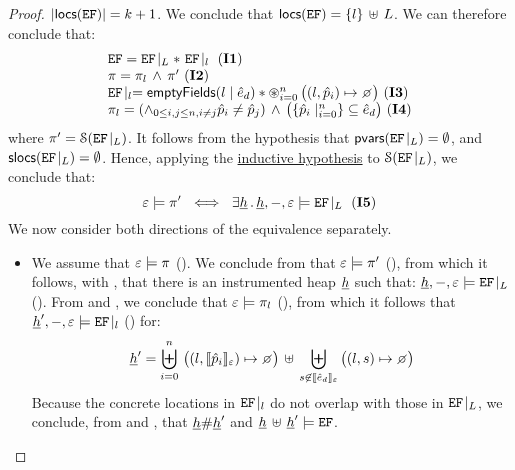 \begin{proof}
\noindent{}  $\vert {\sf locs}(\mathtt{EF}) \vert = k+1$. We conclude that 
${\sf locs}(\mathtt{EF}) = \{ l \} \, \uplus \, L$. We can therefore conclude that: 
$$
\begin{array}{l}
\efs = \efproj{\efs}{L} \sep \ \efproj{\efs}{\loc} \text{ (\ieq{1})}
%
\\
%
\pc = \pc_{\loc} \, \wedge \, \pc' \text{ (\ieq{2})}
%
\\ 
%
 \efproj{\efs}{\loc} = \emptyfields{\loc}{\sexpr_d} \sep  \oast_{i = 0}^{n} \, \big((l, \sexprp_i) \mapsto \none\big) \text{ (\ieq{3})}
%
\\ 
\pc_{\loc} = (\wedge_{0 \leq i, j \leq n, i \neq j} \sexprp_i \neq \sexprp_j)
		       \, \wedge \,  \big(\{  \sexprp_i \mid_{i = 0}^n \} \subseteq \sexpr_d \big) \text{ (\ieq{4})}
\end{array}
$$
where $\pi' = {\cal S}(\mathtt{EF}\!\mid_{L})$. It follows from the hypothesis 
that ${\sf pvars}(\mathtt{EF}\!\mid_{L}) = \emptyset$, and ${\sf slocs}(\mathtt{EF}\!\mid_{L}) = \emptyset$.
Hence, applying the \underline{inductive hypothesis} to ${\cal S}(\mathtt{EF}\!\mid_{L})$, 
we conclude that: 
$$
  \senv \satisfies \pc' \ \iff \ 
       \exists \iheap \, . \, \iheap, -, \senv \satisfies \efproj{\efs}{L} \text{ (\ieq{5})}
$$
We now consider both directions of the equivalence separately. 
\begin{itemize}
	\item {} We assume that $\varepsilon \models \pi$ (). We conclude from 
	 that $\varepsilon \models \pi'$ (\ieq{7}), from which it follows, with \ieq{5},  that there is an 
	 instrumented heap $\underline{h}$ such that: $\underline{h}, -, \varepsilon \models \mathtt{EF}\!\mid_{L}$ (\ieq{8}). 
	From \ieq{6} and \ieq{2}, we conclude that  $\varepsilon \models \pi_{l}$ (\ieq{9}), from which 
	it follows that $\underline{h}', -, \varepsilon \models \mathtt{EF}\!\mid_{l}$ (\ieq{10}) for: 
	$$
	  \iheap' =   \biguplus_{i = 0}^{n} \, \big((l, \symbeval{\sexprp_i}{\senv}) \mapsto  \none \big) 
	       \dunion \biguplus_{\jstring \not\in \symbeval{\sexpr_d}{\senv}} \big((l, \jstring) \mapsto \none \big) 
	$$ %
	Because the concrete locations in $\mathtt{EF}\!\mid_{l}$ do 
	not overlap with those in $\mathtt{EF}\!\mid_{L}$, we conclude, from  and , that 
	$\underline{h} \# \underline{h}'$ and $\underline{h} \, \uplus \, \underline{h}' \models \mathtt{EF}$. 
	\vspace{4pt}
	

\end{itemize}
\end{proof}
